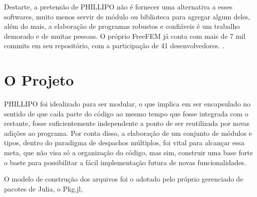 Destarte, a pretensão de PHILLIPO não é fornecer uma alternativa a esses softwares, muito menos servir de módulo ou biblioteca para agregar algum deles, além do mais, a elaboração de programas robustos e confiáveis é um trabalho demorado e de muitas pessoas. O próprio FreeFEM já conta com mais de 7 mil commits em seu repositório, com a participação de 41 desenvolvedores. \cite{Hecht}. 

\section{O Projeto}

PHILLIPO foi idealizado para ser modular, o que implica em ser encapsulado no sentido de que cada parte do código ao mesmo tempo que fosse integrada com o restante, fosse suficientemente independente a ponto de ser reutilizada por novas adições ao programa. Por conta disso, a elaboração de um conjunto de módulos e tipos, dentro do paradigma de despachos múltiplos, foi vital para alcançar essa meta, que não visa só a organização do código, mas sim, construir uma base forte o baste para possibilitar a fácil implementação futura de novas funcionalidades.

O modelo de construção dos arquivos foi o adotado pelo próprio gerenciado de pacotes de Julia, o Pkg.jl, 
